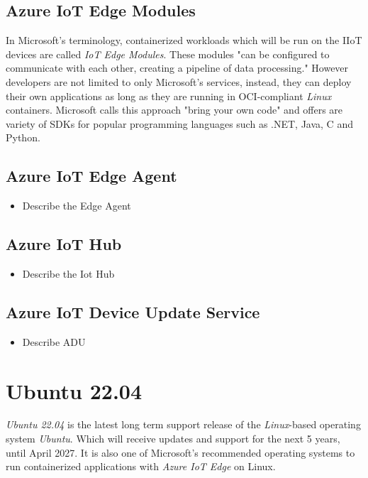 \subsection{Azure IoT Edge Modules}
In Microsoft's terminology, containerized workloads which will be run on the \ac{IIoT}
devices are called \textit{IoT Edge Modules}. These modules "can be configured to
communicate with each other, creating a pipeline of data processing." However developers are
not limited to only Microsoft's services, instead, they can deploy their own
applications as long as they are running in \ac{OCI}-compliant \textit{Linux} containers.
Microsoft calls this approach "bring your own code" and offers are variety of
\ac{SDK}s for popular programming languages such as .NET, Java, C and Python\cite{msdoc-supportetplatforms}.

\subsection{Azure IoT Edge Agent}
\begin{tcolorbox}[title=TODO]
    \begin{itemize}
        \item Describe the Edge Agent
    \end{itemize}
\end{tcolorbox}

\subsection{Azure IoT Hub}
\begin{tcolorbox}[title=TODO]
    \begin{itemize}
        \item Describe the Iot Hub
    \end{itemize}
\end{tcolorbox}

\subsection{Azure IoT Device Update Service}
\begin{tcolorbox}[title=TODO]
    \begin{itemize}
        \item Describe ADU
    \end{itemize}
\end{tcolorbox}

\section{Ubuntu 22.04}
\textit{Ubuntu 22.04} is the latest long term support release of the \textit{Linux}-based operating system \textit{Ubuntu}. Which will receive updates and support
for the next 5 years, until April 2027\cite{ubuntu-releasenote}. It is also one of
Microsoft's recommended operating systems to run containerized applications with
\textit{Azure IoT Edge} on Linux\cite{msdoc-supportetplatforms}.


